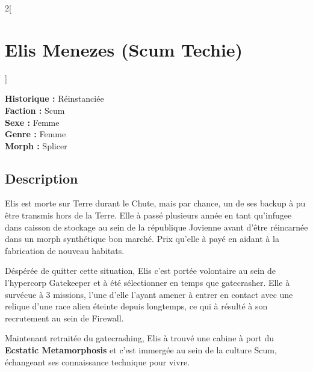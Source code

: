 \documentclass[a4paper,9pt]{article}
\begin{document}
\newpage

\begin{multicols}{2}[\section*{Elis Menezes (Scum Techie)}]

   \noindent\textbf{Historique :} Réinstanciée\\
   \noindent\textbf{Faction :} Scum\\
   \noindent\textbf{Sexe :} Femme\\
   \noindent\textbf{Genre :} Femme\\
   \noindent\textbf{Morph :} Splicer\\

   \subsection*{Description}

   Elis est morte sur Terre durant le Chute, mais par chance, un de ses backup à
   pu être transmis hors de la Terre.
   Elle à passé plusieurs année en tant qu'infugee dans caisson de stockage
   au sein de la république Jovienne avant d'être réincarnée dans un morph
   synthétique bon marché. Prix qu'elle à payé en aidant à la fabrication
   de nouveau habitats.

   Déspérée de quitter cette situation, Elis c'est portée volontaire au sein
   de l'hypercorp Gatekeeper et à été sélectionner en temps que gatecrasher.
   Elle à survécue à 3 missions, l'une d'elle l'ayant amener à entrer en contact
   avec une relique d'une race alien éteinte depuis longtemps, ce qui à résulté
   à son recrutement au sein de Firewall.

   Maintenant retraitée du gatecrashing, Elis à trouvé une cabine à port du
   \textbf{Ecstatic Metamorphosis} et c'est immergée au sein de la culture
   Scum, échangeant ses connaissance technique pour vivre.


\end{multicols}
\end{document}
